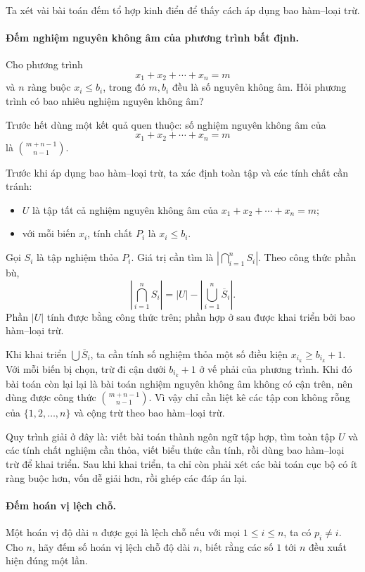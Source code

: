 \documentclass[11pt]{article}
\begin{document}
Ta xét vài bài toán đếm tổ hợp kinh điển để thấy cách áp dụng bao hàm--loại
trừ.

\paragraph{Đếm nghiệm nguyên không âm của phương trình bất định.}
Cho phương trình
\[
  x_1+x_2+\cdots+x_n=m
\]
và \(n\) ràng buộc \(x_i\le b_i\), trong đó \(m,b_i\) đều là số nguyên không
âm. Hỏi phương trình có bao nhiêu nghiệm nguyên không âm?

Trước hết dùng một kết quả quen thuộc: số nghiệm nguyên không âm của
\[
  x_1+x_2+\cdots+x_n=m
\]
là \(\binom{m+n-1}{n-1}\).

Trước khi áp dụng bao hàm--loại trừ, ta xác định toàn tập và các tính chất cần
tránh:
\begin{itemize}
  \item \(U\) là tập tất cả nghiệm nguyên không âm của
  \(x_1+x_2+\cdots+x_n=m\);
  \item với mỗi biến \(x_i\), tính chất \(P_i\) là \(x_i\le b_i\).
\end{itemize}
Gọi \(S_i\) là tập nghiệm thỏa \(P_i\). Giá trị cần tìm là
\(|\bigcap_{i=1}^n S_i|\). Theo công thức phần bù,
\[
  \left|\bigcap_{i=1}^n S_i\right|
  = |U|-\left|\bigcup_{i=1}^n \overline S_i\right|.
\]
Phần \(|U|\) tính được bằng công thức trên; phần hợp ở sau được khai triển bởi
bao hàm--loại trừ.

Khi khai triển \(\bigcup \overline S_i\), ta cần tính số nghiệm thỏa một số
điều kiện \(x_{i_k}\ge b_{i_k}+1\). Với mỗi biến bị chọn, trừ đi cận dưới
\(b_{i_k}+1\) ở vế phải của phương trình. Khi đó bài toán còn lại lại là bài
toán nghiệm nguyên không âm không có cận trên, nên dùng được công thức
\(\binom{m+n-1}{n-1}\). Vì vậy chỉ cần liệt kê các tập con không rỗng của
\(\{1,2,\ldots,n\}\) và cộng trừ theo bao hàm--loại trừ.

Quy trình giải ở đây là: viết bài toán thành ngôn ngữ tập hợp, tìm toàn tập
\(U\) và các tính chất nghiệm cần thỏa, viết biểu thức cần tính, rồi dùng bao
hàm--loại trừ để khai triển. Sau khi khai triển, ta chỉ còn phải xét các bài
toán cục bộ có ít ràng buộc hơn, vốn dễ giải hơn, rồi ghép các đáp án lại.

\paragraph{Đếm hoán vị lệch chỗ.}
Một hoán vị độ dài \(n\) được gọi là lệch chỗ nếu với mọi \(1\le i\le n\),
ta có \(p_i\ne i\). Cho \(n\), hãy đếm số hoán vị lệch chỗ độ dài \(n\), biết
rằng các số \(1\) tới \(n\) đều xuất hiện đúng một lần.
\end{document}
